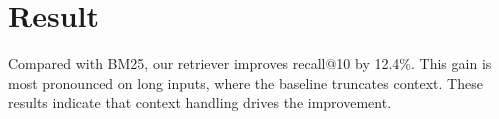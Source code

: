 \section{Result}

Compared with BM25, our retriever improves recall@10 by 12.4\%.
This gain is most pronounced on long inputs, where the baseline truncates context.
These results indicate that context handling drives the improvement.
